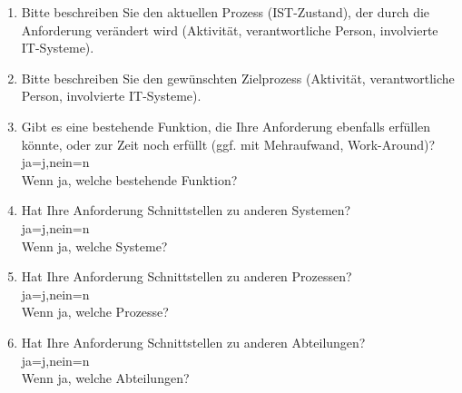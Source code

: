 \begin{Form}
\begin{enumerate}
  	\item Bitte beschreiben Sie den aktuellen Prozess (IST-Zustand), der durch die Anforderung verändert wird (Aktivität, verantwortliche Person, involvierte IT-Systeme). \\
  	\TextField[multiline, name=proces,width=0.9\textwidth,  height=2cm, value={}]{}
  
  \item Bitte beschreiben Sie den gewünschten Zielprozess (Aktivität, verantwortliche Person, involvierte IT-Systeme). \\ 
  \TextField[multiline, name=descrgoal,width=0.9\textwidth,  height=2cm, value={}]{}

	\item Gibt es eine bestehende Funktion, die Ihre Anforderung ebenfalls erfüllen könnte, oder zur Zeit noch erfüllt (ggf. mit Mehraufwand, Work-Around)? \\ 
	\ChoiceMenu[radio, radiosymbol=6 default=n, width=0.5cm, name=func]{} {ja=j,nein=n} \\
	Wenn ja, welche bestehende Funktion? \\
	\TextField[multiline, name=jfunc,width=0.9\textwidth,  height=2cm, value={}]{}
	
	\item Hat Ihre Anforderung Schnittstellen zu anderen Systemen? \\ 
	\ChoiceMenu[radio, radiosymbol=6 default=n, width=0.5cm, name=consesyst]{} {ja=j,nein=n} \\
	Wenn ja, welche Systeme? \\
	\TextField[multiline, name=jconsesyst,width=0.9\textwidth,  height=2cm, value={}]{}
	\newpage
	
	\item Hat Ihre Anforderung Schnittstellen zu anderen Prozessen? \\ 
	\ChoiceMenu[radio, radiosymbol=6 default=n, width=0.5cm, name=consepro]{} {ja=j,nein=n} \\
	Wenn ja, welche Prozesse? \\
	\TextField[multiline, name=jconsepro,width=0.9\textwidth,  height=2cm, value={}]{}
	
	\item Hat Ihre Anforderung Schnittstellen zu anderen Abteilungen? \\ 
	\ChoiceMenu[radio, radiosymbol=6 default=n, width=0.5cm, name=consedep]{} {ja=j,nein=n} \\
	Wenn ja, welche Abteilungen? \\
	\TextField[multiline, name=jconsedep,width=0.9\textwidth,  height=2cm, value={}]{}
	

\end{enumerate}
\end{Form}
